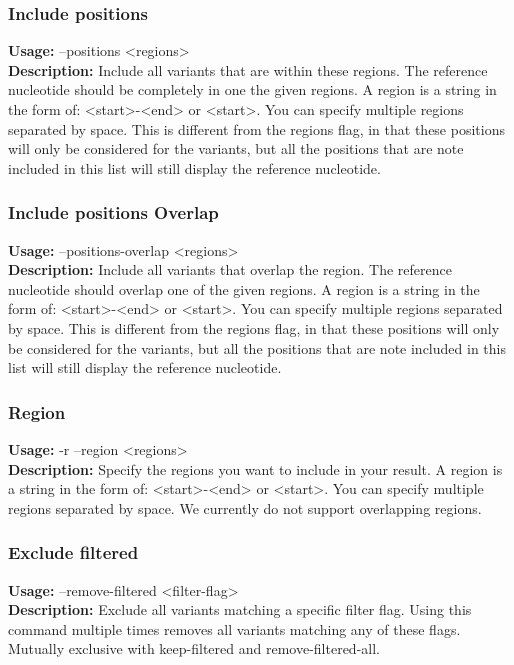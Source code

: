 \subsubsection{Include positions}
\textbf{Usage:} --positions <regions>\\	
\textbf{Description:} Include all variants that are within these regions. The reference nucleotide should be completely in one the given regions. A region is a string in the form of: <start>-<end> or <start>. You can specify multiple regions separated by space. 
This is different from the regions flag, in that these positions will only be considered for the variants, but all the positions that are note included in this list will still display the reference nucleotide.

\subsubsection{Include positions Overlap}
\textbf{Usage:} --positions-overlap <regions>	\\
\textbf{Description:} Include all variants that overlap the region. The reference nucleotide should overlap one of the given regions. A region is a string in the form of: <start>-<end> or <start>. You can specify multiple regions separated by space.
This is different from the regions flag, in that these positions will only be considered for the variants, but all the positions that are note included in this list will still display the reference nucleotide.

\subsubsection{Region}
\textbf{Usage:} -r --region <regions>\\
\textbf{Description:} Specify the regions you want to include in your result. A region is a string in the form of: <start>-<end> or <start>. You can specify multiple regions separated by space. We currently do not support overlapping regions.

\subsubsection{Exclude filtered}
\textbf{Usage:} --remove-filtered <filter-flag>\\
\textbf{Description:} Exclude all variants matching a specific filter flag. Using this command multiple times removes all variants matching any of these flags. Mutually exclusive with keep-filtered and remove-filtered-all.

